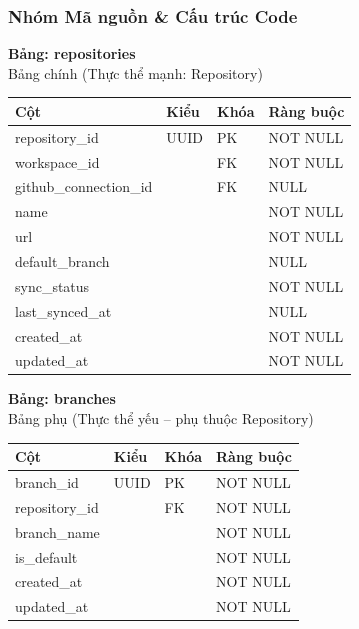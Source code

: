 \subsubsection{Nhóm Mã nguồn \& Cấu trúc Code}

\textbf{Bảng: repositories}\\
Bảng chính (Thực thể mạnh: Repository)
\begin{table}[H]
\centering
\begin{tabular}{|l|l|l|l|}
\hline
\textbf{Cột} & \textbf{Kiểu} & \textbf{Khóa} & \textbf{Ràng buộc} \\ \hline
repository\_id & UUID & PK & NOT NULL \\ \hline
workspace\_id & & FK & NOT NULL \\ \hline
github\_connection\_id & & FK & NULL \\ \hline
name & & & NOT NULL \\ \hline
url & & & NOT NULL \\ \hline
default\_branch & & & NULL \\ \hline
sync\_status & & & NOT NULL \\ \hline
last\_synced\_at & & & NULL \\ \hline
created\_at & & & NOT NULL \\ \hline
updated\_at & & & NOT NULL \\ \hline
\end{tabular}
\end{table}

\textbf{Bảng: branches}\\
Bảng phụ (Thực thể yếu – phụ thuộc Repository)
\begin{table}[H]
\centering
\begin{tabular}{|l|l|l|l|}
\hline
\textbf{Cột} & \textbf{Kiểu} & \textbf{Khóa} & \textbf{Ràng buộc} \\ \hline
branch\_id & UUID & PK & NOT NULL \\ \hline
repository\_id & & FK & NOT NULL \\ \hline
branch\_name & & & NOT NULL \\ \hline
is\_default & & & NOT NULL \\ \hline
created\_at & & & NOT NULL \\ \hline
updated\_at & & & NOT NULL \\ \hline
\end{tabular}
\end{table}

